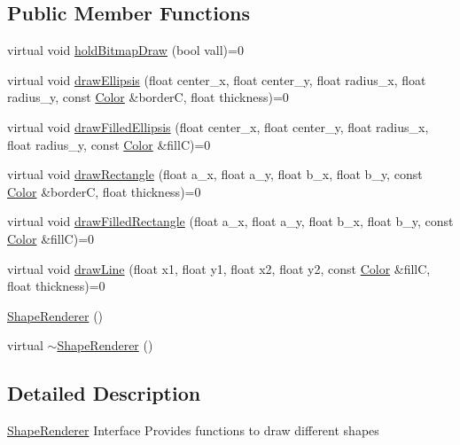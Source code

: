 \subsection*{Public Member Functions}
\begin{DoxyCompactItemize}
\item 
virtual void \hyperlink{classZeta_1_1ShapeRenderer_a65232f651234132c00b23335ce13ceba}{hold\+Bitmap\+Draw} (bool vall)=0
\item 
virtual void \hyperlink{classZeta_1_1ShapeRenderer_acf165e896b1ba10239a5652a97b95a08}{draw\+Ellipsis} (float center\+\_\+x, float center\+\_\+y, float radius\+\_\+x, float radius\+\_\+y, const \hyperlink{classZeta_1_1Color}{Color} \&border\+C, float thickness)=0
\item 
virtual void \hyperlink{classZeta_1_1ShapeRenderer_a9ae3456ae2966b77cbf97cbf28240b5e}{draw\+Filled\+Ellipsis} (float center\+\_\+x, float center\+\_\+y, float radius\+\_\+x, float radius\+\_\+y, const \hyperlink{classZeta_1_1Color}{Color} \&fill\+C)=0
\item 
virtual void \hyperlink{classZeta_1_1ShapeRenderer_aa20b1c2e175e21ccf7dc63ef5ad231c8}{draw\+Rectangle} (float a\+\_\+x, float a\+\_\+y, float b\+\_\+x, float b\+\_\+y, const \hyperlink{classZeta_1_1Color}{Color} \&border\+C, float thickness)=0
\item 
virtual void \hyperlink{classZeta_1_1ShapeRenderer_a496f71ef238b32e0b7d54120b6f452ac}{draw\+Filled\+Rectangle} (float a\+\_\+x, float a\+\_\+y, float b\+\_\+x, float b\+\_\+y, const \hyperlink{classZeta_1_1Color}{Color} \&fill\+C)=0
\item 
virtual void \hyperlink{classZeta_1_1ShapeRenderer_a451fedfb9589ec09fa2d5e30dd4c708d}{draw\+Line} (float x1, float y1, float x2, float y2, const \hyperlink{classZeta_1_1Color}{Color} \&fill\+C, float thickness)=0
\item 
\hyperlink{classZeta_1_1ShapeRenderer_a42f2de449e91b81b2907d2666684cfb2}{Shape\+Renderer} ()
\item 
virtual \hyperlink{classZeta_1_1ShapeRenderer_a13c1e06aa71d946425c95b4d43430b44}{$\sim$\+Shape\+Renderer} ()
\end{DoxyCompactItemize}


\subsection{Detailed Description}
\hyperlink{classZeta_1_1ShapeRenderer}{Shape\+Renderer} Interface Provides functions to draw different shapes 


